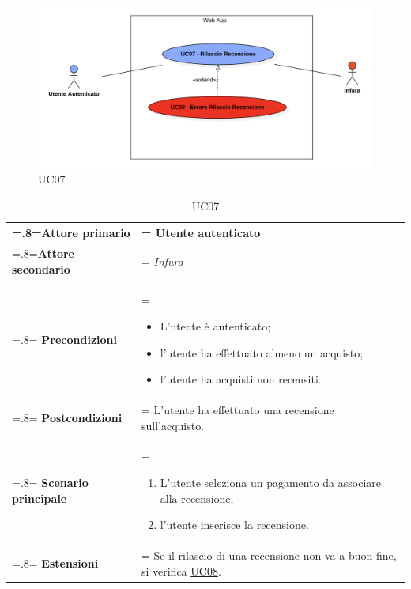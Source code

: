             \begin{figure}[H]
                \centering
                \includegraphics[scale=0.6]{src/img/UC07.png}
                \caption{UC07}
            \end{figure}

            \begin{table}[H]
                \centering
                \renewcommand{\arraystretch}{1.8}
                \renewcommand\tabularxcolumn[1]{m{#1}}
                \begin{tabularx}{0.9\textwidth}{
                    >{\hsize=.8\hsize\linewidth=\hsize}X
                    >{\hsize=1.2\hsize\linewidth=\hsize}X}
                    \hline
                    \textbf{Attore primario} & Utente autenticato \\
                    \hline
                    \textbf{Attore secondario} & \textit{Infura} \\
                    \hline
                    \textbf{Precondizioni} &
                        \begin{itemize}
                            \item L'utente è autenticato;
                            \item l'utente ha effettuato almeno un acquisto;
                            \item l'utente ha acquisti non recensiti.
                        \end{itemize} \\
                    \hline
                    \textbf{Postcondizioni} & L'utente ha effettuato una recensione sull'acquisto. \\
                    \hline
                    \textbf{Scenario principale} &
                        \begin{enumerate}
                            \item L'utente seleziona un pagamento da associare alla recensione;
                            \item l'utente inserisce la recensione.
                        \end{enumerate} \\
                    \hline
                    \textbf{Estensioni} & Se il rilascio di una recensione non va a buon fine, si verifica \hyperref[UC08]{UC08}. \\
                    \hline
                \end{tabularx}
                \caption{UC07}
            \end{table}

